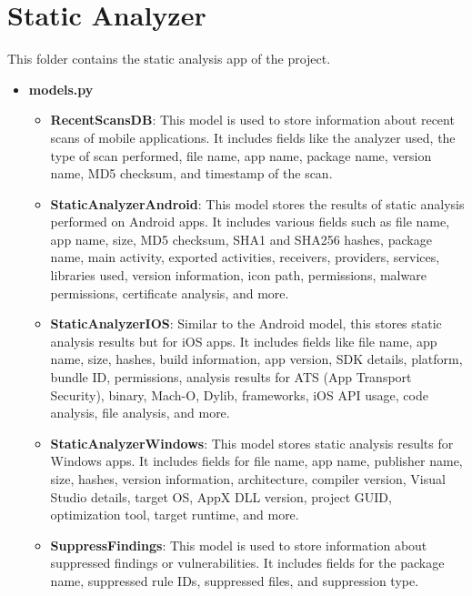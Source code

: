 \documentclass{report}
\begin{document}
\section{Static Analyzer}
This folder contains the static analysis app of the project.
\begin{itemize}
    \item \textbf\textbf{models.py}
    \begin{itemize}
        \item \textbf{RecentScansDB}: This model is used to store information about recent scans of mobile applications. It includes fields like the analyzer used, the type of scan performed, file name, app name, package name, version name, MD5 checksum, and timestamp of the scan.
        
        \item \textbf{StaticAnalyzerAndroid}: This model stores the results of static analysis performed on Android apps. It includes various fields such as file name, app name, size, MD5 checksum, SHA1 and SHA256 hashes, package name, main activity, exported activities, receivers, providers, services, libraries used, version information, icon path, permissions, malware permissions, certificate analysis, and more.
        
        \item \textbf{StaticAnalyzerIOS}: Similar to the Android model, this stores static analysis results but for iOS apps. It includes fields like file name, app name, size, hashes, build information, app version, SDK details, platform, bundle ID, permissions, analysis results for ATS (App Transport Security), binary, Mach-O, Dylib, frameworks, iOS API usage, code analysis, file analysis, and more.
        
        \item \textbf{StaticAnalyzerWindows}: This model stores static analysis results for Windows apps. It includes fields for file name, app name, publisher name, size, hashes, version information, architecture, compiler version, Visual Studio details, target OS, AppX DLL version, project GUID, optimization tool, target runtime, and more.
        
        \item \textbf{SuppressFindings}: This model is used to store information about suppressed findings or vulnerabilities. It includes fields for the package name, suppressed rule IDs, suppressed files, and suppression type.
    \end{itemize}


\end{itemize}
\end{document}
